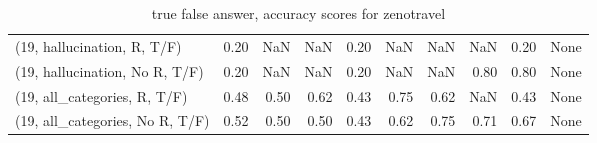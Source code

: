 \begin{table*}[h!]
\begin{adjustbox}{width=2\columnwidth,center}
\begin{tabular}{lrrr|rrr|rrr}
(19, hallucination, R, T/F)           &                      0.20 &                   NaN &                       NaN &                          0.20 &                       NaN &                           NaN &                                    NaN &                               0.20 &                                  None \\
(19, hallucination, No R, T/F)        &                      0.20 &                   NaN &                       NaN &                          0.20 &                       NaN &                           NaN &                                   0.80 &                               0.80 &                                  None \\
(19, all\_categories, R, T/F)          &                      0.48 &                  0.50 &                      0.62 &                          0.43 &                      0.75 &                          0.62 &                                    NaN &                               0.43 &                                  None \\
(19, all\_categories, No R, T/F)       &                      0.52 &                  0.50 &                      0.50 &                          0.43 &                      0.62 &                          0.75 &                                   0.71 &                               0.67 &                                  None \\


\bottomrule
\end{tabular}
\end{adjustbox}
\caption{true false answer, accuracy scores for zenotravel}
\end{table*}